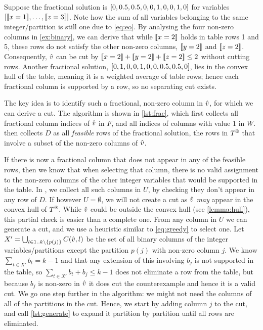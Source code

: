 \documentclass[a4paper,UKenglish,cleveref,autoref,thm-restate]{lipics-v2021}
\begin{document}
\begin{example}
    Suppose the fractional solution is $[0,0.5,0.5,0,0,1,0,0,1,0]$ for variables $\sequence{\be{1}{1}, \ldots, \be{3}{3}}$.
    Note how the sum of all variables belonging to the same \mbox{integer/partition} is still one due to \cref{eq:eo}.
    By analysing the four non-zero columns in \cref{ex:binary}, we can derive that while $\be{1}{2}$ holds in table rows 1 and 5,
    these rows do not satisfy the other non-zero columns, $\be{2}{2}$ and $\be{3}{2}$.
    Consequently, $\hat{v}$ can be cut by $\be{1}{2} + \be{2}{2} + \be{3}{2} \leq 2$ without cutting rows.
    Another fractional solution, $[0,1,0,0,1,0,0,0.5,0.5,0]$, lies in the convex hull of the table, meaning it is a weighted average of table rows; hence each fractional column is supported by a row, so no separating cut exists.
\end{example}

The key idea is to identify such a fractional, non-zero column in $\hat{v}$, for which we can derive a cut.
The algorithm is shown in \cref{lst:frac}, which first collects all fractional column indices of $\hat{v}$ in $F$, and all indices of columns with value $1$ in $W$.
 then collects $D$ as all \textit{feasible} rows of the fractional solution, \ie the rows in $T^{\mathbb{B}}$ that involve a subset of the non-zero columns of $\hat{v}$.

If there is now a fractional column that does not appear in any of the feasible rows, then we know that when selecting that column, there is no valid assignment to the non-zero columns of the other integer variables that would be supported in the table.
In , we collect all such columns in $U$, by checking they don't appear in any row of $D$. 
If however $U = \emptyset$, we will not create a cut as $\hat{v}$ \textit{may} appear in the convex hull of $T^{\mathbb{B}}$.
While $\hat{v}$ could be outside the convex hull (see \cref{lemma:hull}), this partial check is easier than a complete one. 
From any column in $U$ we can generate a cut, and we use a heuristic similar to \cref{eq:greedy} to select one.
Let $X' = \bigcup_{l \in 1..k\setminus{\{p(j)\}}} C(\hat{v}, l)$ 
be the set of all binary columns of the integer variables/partitions except the partition $p(j)$ with non-zero column $j$.
We know $\sum_{t \in X'} b_t = k-1$ and that any extension of this involving $b_j$ is not supported in the table, so $\sum_{t \in X'} b_t + b_j \leq k-1$ does not eliminate a row from the table, but because $b_j$ is non-zero in $\hat{v}$ it does cut the counterexample and hence it is a valid cut.
We go one step further in the algorithm: we might not need the columns of all of the partitions in the cut. Hence, we start by adding column $j$ to the cut, and call \cref{lst:generate} to expand it partition by partition until all rows are eliminated.
\end{document}
